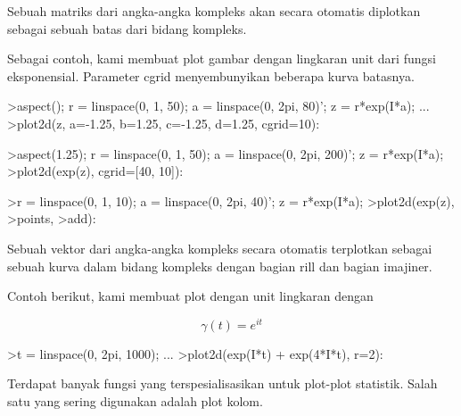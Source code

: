 \documentclass[a4paper,10pt]{article}
\begin{document}
\begin{eulernotebook}
\begin{eulercomment}
\begin{eulercomment}
\begin{eulercomment}
\begin{eulercomment}
\begin{eulercomment}
Sebuah matriks dari angka-angka kompleks akan secara otomatis
diplotkan sebagai sebuah batas dari bidang kompleks.

Sebagai contoh, kami membuat plot gambar dengan lingkaran unit dari
fungsi eksponensial. Parameter cgrid menyembunyikan beberapa kurva
batasnya.
\end{eulercomment}
\begin{eulerprompt}
>aspect(); r = linspace(0, 1, 50); a = linspace(0, 2pi, 80)'; z = r*exp(I*a); ...
>plot2d(z, a=-1.25, b=1.25, c=-1.25, d=1.25, cgrid=10):
\end{eulerprompt}
\begin{eulerprompt}
>aspect(1.25); r = linspace(0, 1, 50); a = linspace(0, 2pi, 200)'; z = r*exp(I*a);
>plot2d(exp(z), cgrid=[40, 10]):
\end{eulerprompt}
\begin{eulerprompt}
>r = linspace(0, 1, 10); a = linspace(0, 2pi, 40)'; z = r*exp(I*a);
>plot2d(exp(z), >points, >add):
\end{eulerprompt}
\begin{eulercomment}
Sebuah vektor dari angka-angka kompleks secara otomatis terplotkan
sebagai sebuah kurva dalam bidang kompleks dengan bagian rill dan
bagian imajiner.

Contoh berikut, kami membuat plot dengan unit lingkaran dengan\\
\end{eulercomment}
\begin{eulerformula}
\[
\gamma(t) = e^{it}
\]
\end{eulerformula}
\begin{eulerprompt}
>t = linspace(0, 2pi, 1000); ...
>plot2d(exp(I*t) + exp(4*I*t), r=2):
\end{eulerprompt}
\begin{eulercomment}
Terdapat banyak fungsi yang terspesialisasikan untuk plot-plot
statistik. Salah satu yang sering digunakan adalah plot kolom.


\end{eulercomment}
\end{eulercomment}
\end{eulercomment}
\end{eulercomment}
\end{eulercomment}
\end{eulernotebook}
\end{document}
